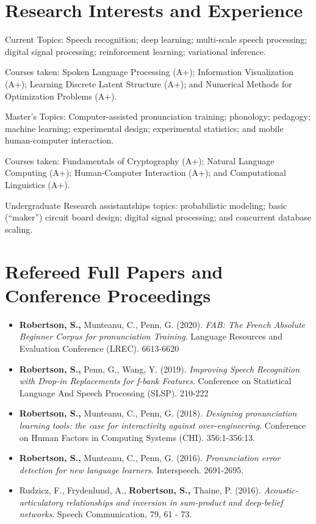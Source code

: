 \documentclass{article}
\begin{document}
\section{Research Interests and Experience}
\begin{CV}
  \item[Current] Topics: Speech recognition; deep learning; multi-scale
    speech processing; digital signal processing; reinforcement learning;
    variational inference.

    Courses taken: Spoken Language Processing (A+);
    Information Visualization (A+);
    Learning Discrete Latent Structure (A+);
    and Numerical Methods for Optimization Problems (A+).

  \item[Master's] Topics: Computer-assisted pronunciation training;
    phonology; pedagogy; machine learning; experimental design; experimental
    statistics; and mobile human-computer interaction.

    Courses taken: Fundamentals of Cryptography (A+); Natural Language
    Computing (A+); Human-Computer Interaction (A+); and Computational
    Linguistics (A+).

  \item[Undergraduate] Research assistantships topics: probabilistic modeling;
    basic (``maker'') circuit board design; digital signal processing; and
    concurrent database scaling.

\end{CV}

\section{Refereed Full Papers and Conference Proceedings}
\begin{itemize}
  \item \textbf{Robertson, S.,} Munteanu, C., Penn, G. (2020).
    \textit{FAB: The French Absolute Beginner Corpus for pronunciation
    Training}. Language Resources and Evaluation Conference (LREC). 6613-6620

  \item \textbf{Robertson, S.,} Penn, G., Wang, Y. (2019).
    \textit{Improving Speech Recognition with Drop-in Replacements for f-bank
    Features}. Conference on Statistical Language And Speech Processing
    (SLSP). 210-222

  \item \textbf{Robertson, S.,} Munteanu, C., Penn, G. (2018).
    \textit{Designing pronunciation learning tools: the case for interactivity
    against over-engineering}. Conference on Human Factors in Computing Systems
    (CHI). 356:1-356:13.

  \item \textbf{Robertson, S.,} Munteanu, C., Penn, G. (2016).
    \textit{Pronunciation error detection for new language learners}.
    Interspeech. 2691-2695.

  \item Rudzicz, F., Frydenlund, A., \textbf{Robertson, S.,} Thaine, P. (2016).
    \textit{Acoustic-articulatory relationships and inversion in sum-product
    and deep-belief networks}. Speech Communication, 79, 61 - 73.
\end{itemize}
\end{document}
